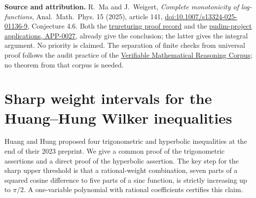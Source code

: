 \documentclass[11pt,a4paper]{article}
\numberwithin{equation}{section}
\theoremstyle{definition}
\theoremstyle{remark}
\newenvironment{sectionabstract}{\par\smallskip\begingroup\small\noindent}{\par\endgroup\medskip}
\begin{document}
\textbf{Source and attribution.}
R.~Ma and J.~Weigert, \emph{Complete monotonicity of log-functions},
Anal.~Math.~Phys. 15 (2025), article 141,
\href{https://doi.org/10.1007/s13324-025-01136-9}{doi:10.1007/s13324-025-01136-9},
Conjecture 4.6. Both the
\href{https://www.trureturing.org/research/ma-weigert-2025-log-function-monotone-chain/}{trureturing proof record}
and the \href{https://github.com/pudim-project/pudim-ai-demo-zetalaw/blob/main/APPLICATIONS.md}{pudim-project applications, APP-0027},
already give the conclusion; the latter gives the integral argument.
No priority is claimed. The separation of finite checks from universal
proof follows the audit practice of the
\href{https://github.com/QEEDDD/Verifiable-Mathematical-Reasoning-Corpus}{Verifiable Mathematical Reasoning Corpus};
no theorem from that corpus is needed.

\par\endgroup

\begingroup

\section{\texorpdfstring{Sharp weight intervals for the Huang--Hung Wilker inequalities}{Sharp weight intervals for the Huang--Hung Wilker inequalities}}\label{section:r26reiwa}
\par\medskip


\begin{sectionabstract}
Huang and Hung proposed four trigonometric and hyperbolic inequalities at the end of their 2023 preprint. We give a common proof of the trigonometric assertions and a direct proof of the hyperbolic assertion. The key step for the sharp upper threshold is that a rational-weight combination, seven parts of a squared cosine difference to five parts of a sinc function, is strictly increasing up to $\pi/2$. A one-variable polynomial with rational coefficients certifies this claim.
\end{sectionabstract}
\end{document}
